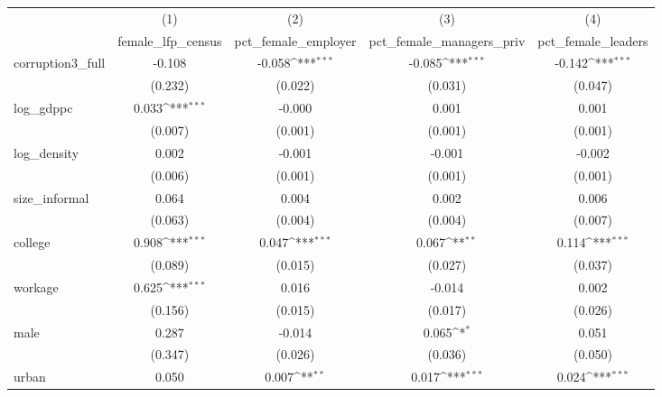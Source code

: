 {
\def\sym#1{\ifmmode^{#1}\else\(^{#1}\)\fi}
\begin{tabular}{l*{4}{c}}
\hline\hline
            &\multicolumn{1}{c}{(1)}&\multicolumn{1}{c}{(2)}&\multicolumn{1}{c}{(3)}&\multicolumn{1}{c}{(4)}\\
            &\multicolumn{1}{c}{female\_lfp\_census}&\multicolumn{1}{c}{pct\_female\_employer}&\multicolumn{1}{c}{pct\_female\_managers\_priv}&\multicolumn{1}{c}{pct\_female\_leaders}\\
\hline
corruption3\_full&      -0.108         &      -0.058\sym{***}&      -0.085\sym{***}&      -0.142\sym{***}\\
            &     (0.232)         &     (0.022)         &     (0.031)         &     (0.047)         \\
[1em]
log\_gdppc   &       0.033\sym{***}&      -0.000         &       0.001         &       0.001         \\
            &     (0.007)         &     (0.001)         &     (0.001)         &     (0.001)         \\
[1em]
log\_density &       0.002         &      -0.001         &      -0.001         &      -0.002         \\
            &     (0.006)         &     (0.001)         &     (0.001)         &     (0.001)         \\
[1em]
size\_informal&       0.064         &       0.004         &       0.002         &       0.006         \\
            &     (0.063)         &     (0.004)         &     (0.004)         &     (0.007)         \\
[1em]
college     &       0.908\sym{***}&       0.047\sym{***}&       0.067\sym{**} &       0.114\sym{***}\\
            &     (0.089)         &     (0.015)         &     (0.027)         &     (0.037)         \\
[1em]
workage     &       0.625\sym{***}&       0.016         &      -0.014         &       0.002         \\
            &     (0.156)         &     (0.015)         &     (0.017)         &     (0.026)         \\
[1em]
male        &       0.287         &      -0.014         &       0.065\sym{*}  &       0.051         \\
            &     (0.347)         &     (0.026)         &     (0.036)         &     (0.050)         \\
[1em]
urban       &       0.050         &       0.007\sym{**} &       0.017\sym{***}&       0.024\sym{***}\\

\end{tabular}}
